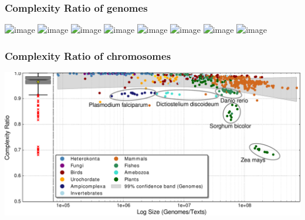 \documentclass[hyperref={pagebackref=true},table]{beamer}
\begin{document}
\begin{frame}
  \frametitle{Complexity Ratio of genomes}
  \begin{center}
    \includegraphics<1>[width=.635\textwidth]{pictures/dna-struct/cr-genomes-0.png}
    \includegraphics<2>[width=.635\textwidth]{pictures/dna-struct/cr-genomes-1.png}
    \includegraphics<3>[width=.635\textwidth]{pictures/dna-struct/cr-genomes-3.png}
    \includegraphics<4>[width=.635\textwidth]{pictures/dna-struct/cr-genomes-2.png}
    \includegraphics<5>[width=.635\textwidth]{pictures/dna-struct/cr-genomes-4.png}
    \includegraphics<6>[width=.635\textwidth]{pictures/dna-struct/cr-genomes-4-1.png}
    \includegraphics<7>[width=.635\textwidth]{pictures/dna-struct/cr-genomes-4-1-5.png}
    \includegraphics<8>[width=.635\textwidth]{pictures/dna-struct/cr-genomes-4-2.png}
  \end{center}
\end{frame}

\begin{frame}
  \frametitle{Complexity Ratio of chromosomes}
  \begin{center}
    \includegraphics[width=\textwidth]{pictures/dna-struct/chroms_norm.pdf}
  \end{center}
\end{frame}
\end{document}
